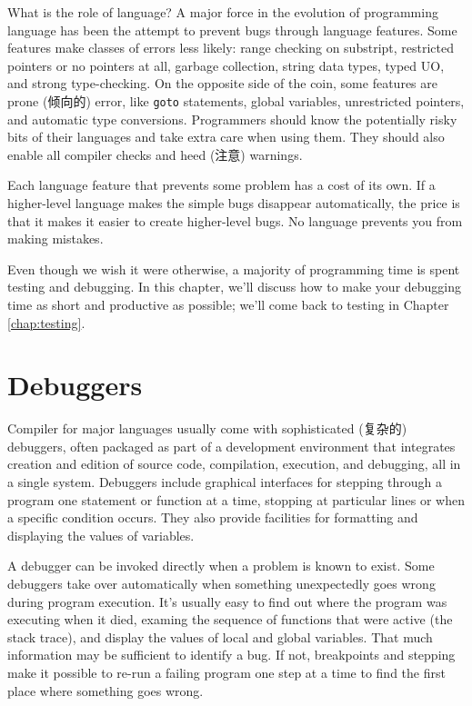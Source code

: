 What is the role of language? A major force in the evolution of programming
language has been the attempt to prevent bugs through language features.
Some features make classes of errors less likely: range checking on
substript, restricted pointers or no pointers at all, garbage collection,
string data types, typed UO, and strong type-checking. On the opposite side
of the coin, some features are prone (倾向的) error, like \verb'goto'
statements, global variables, unrestricted pointers, and automatic type
conversions. Programmers should know the potentially risky bits of their
languages and take extra care when using them. They should also enable all
compiler checks and heed (注意) warnings.

Each language feature that prevents some problem has a cost of its own. If
a higher-level language makes the simple bugs disappear automatically, the
price is that it makes it easier to create higher-level bugs. No language
prevents you from making mistakes.

Even though we wish it were otherwise, a majority of programming time is
spent testing and debugging. In this chapter, we'll discuss how to make
your debugging time as short and productive as possible; we'll come back to
testing in Chapter \ref{chap:testing}.

\section{Debuggers}
\label{sec:debuggers}
Compiler for major languages usually come with sophisticated (复杂的)
debuggers, often packaged as part of a development environment that
integrates creation and edition of source code, compilation, execution, and
debugging, all in a single system. Debuggers include graphical interfaces
for stepping through a program one statement or function at a time,
stopping at particular lines or when a specific condition occurs. They also
provide facilities for formatting and displaying the values of variables.

A debugger can be invoked directly when a problem is known to exist. Some
debuggers take over automatically when something unexpectedly goes wrong
during program execution. It's usually easy to find out where the program
was executing when it died, examing the sequence of functions that were
active (the stack trace), and display the values of local and global
variables. That much information may be sufficient to identify a bug. If
not, breakpoints and stepping make it possible to re-run a failing program
one step at a time to find the first place where something goes wrong.

